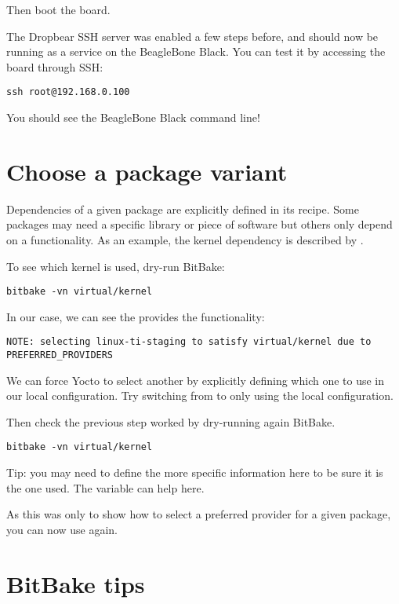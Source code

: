 Then boot the board.

The Dropbear SSH server was enabled a few steps before, and should now be
running as a service on the BeagleBone Black. You can test it by accessing the
board through SSH:
\begin{verbatim}
ssh root@192.168.0.100
\end{verbatim}

You should see the BeagleBone Black command line!

\section{Choose a package variant}

Dependencies of a given package are explicitly defined in its recipe.
Some packages may need a specific library or piece of software but
others only depend on a functionality. As an example, the kernel
dependency is described by .

To see which kernel is used, dry-run BitBake:
\begin{verbatim}
bitbake -vn virtual/kernel
\end{verbatim}

In our case, we can see the  provides the
 functionality:
\small
\begin{verbatim}
NOTE: selecting linux-ti-staging to satisfy virtual/kernel due to PREFERRED_PROVIDERS
\end{verbatim}
\normalsize

We can force Yocto to select another  by explicitly
defining which one to use in our local configuration. Try switching
from  to  only using the
local configuration.

Then check the previous step worked by dry-running again BitBake.
\begin{verbatim}
bitbake -vn virtual/kernel
\end{verbatim}

Tip: you may need to define the more specific information here to be sure
it is the one used. The  variable can help here.

As this was only to show how to select a preferred provider for a
given package, you can now use  again.

\section{BitBake tips}

